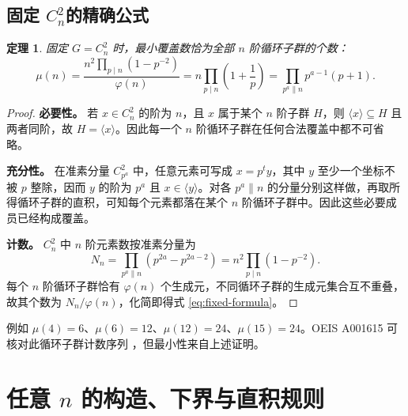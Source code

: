 \documentclass[11pt,a4paper]{article}
\numberwithin{equation}{section}
\theoremstyle{plain}
\newtheorem{theorem}{定理}[section]
\theoremstyle{definition}
\theoremstyle{remark}
\begin{document}
\subsection{固定 \texorpdfstring{$C_n^2$}{Cn 平方}的精确公式}
\begin{theorem}\label{thm:fixed}
固定 $G=C_n^2$ 时，最小覆盖数恰为全部 $n$ 阶循环子群的个数：
\begin{equation}\label{eq:fixed-formula}
 \mu(n)=\frac{n^2\prod_{p\mid n}(1-p^{-2})}{\varphi(n)}
 =n\prod_{p\mid n}\left(1+\frac1p\right)
 =\prod_{p^a\parallel n}p^{a-1}(p+1).
\end{equation}
\end{theorem}
\begin{proof}
\textbf{必要性。} 若 $x\in C_n^2$ 的阶为 $n$，且 $x$ 属于某个 $n$ 阶子群 $H$，则 $\langle x\rangle\subseteq H$ 且两者同阶，故 $H=\langle x\rangle$。因此每一个 $n$ 阶循环子群在任何合法覆盖中都不可省略。

\textbf{充分性。} 在准素分量 $C_{p^a}^2$ 中，任意元素可写成 $x=p^t y$，其中 $y$ 至少一个坐标不被 $p$ 整除，因而 $y$ 的阶为 $p^a$ 且 $x\in\langle y\rangle$。对各 $p^a\parallel n$ 的分量分别这样做，再取所得循环子群的直积，可知每个元素都落在某个 $n$ 阶循环子群中。因此这些必要成员已经构成覆盖。

\textbf{计数。} $C_n^2$ 中 $n$ 阶元素数按准素分量为
\begin{equation}
 N_n=\prod_{p^a\parallel n}(p^{2a}-p^{2a-2})
 =n^2\prod_{p\mid n}(1-p^{-2}).
\end{equation}
每个 $n$ 阶循环子群恰有 $\varphi(n)$ 个生成元，不同循环子群的生成元集合互不重叠，故其个数为 $N_n/\varphi(n)$，化简即得式 \eqref{eq:fixed-formula}。
\end{proof}
例如 $\mu(4)=6$、$\mu(6)=12$、$\mu(12)=24$、$\mu(15)=24$。OEIS A001615 可核对此循环子群计数序列 \cite{OEISpsi}，但最小性来自上述证明。

\section{任意 \texorpdfstring{$n$}{n} 的构造、下界与直积规则}
\end{document}
